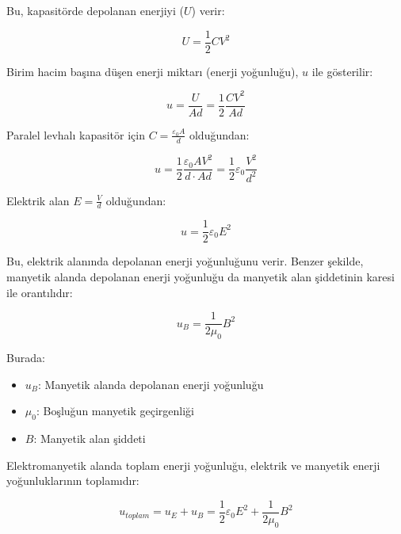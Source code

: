 \documentclass[12pt,a4paper]{fenbil}
\begin{document}
Bu, kapasitörde depolanan enerjiyi ($U$) verir:

\begin{equation}
U = \frac{1}{2} CV^2
\end{equation}

Birim hacim başına düşen enerji miktarı (enerji yoğunluğu), $u$ ile gösterilir:

\begin{equation}
u = \frac{U}{Ad} = \frac{1}{2} \frac{CV^2}{Ad}
\end{equation}

Paralel levhalı kapasitör için $C = \frac{\varepsilon_0 A}{d}$ olduğundan:

\begin{equation}
u = \frac{1}{2} \frac{\varepsilon_0 A V^2}{d \cdot Ad} = \frac{1}{2} \varepsilon_0 \frac{V^2}{d^2}
\end{equation}

Elektrik alan $E = \frac{V}{d}$ olduğundan:

\begin{equation}
u = \frac{1}{2} \varepsilon_0 E^2
\end{equation}

Bu, elektrik alanında depolanan enerji yoğunluğunu verir. Benzer şekilde, manyetik alanda depolanan enerji yoğunluğu da manyetik alan şiddetinin karesi ile orantılıdır:

\begin{equation}
u_B = \frac{1}{2\mu_0} B^2
\end{equation}

Burada:
\begin{itemize}
    \item $u_B$: Manyetik alanda depolanan enerji yoğunluğu
    \item $\mu_0$: Boşluğun manyetik geçirgenliği
    \item $B$: Manyetik alan şiddeti
\end{itemize}

Elektromanyetik alanda toplam enerji yoğunluğu, elektrik ve manyetik enerji yoğunluklarının toplamıdır:

\begin{equation}
u_{toplam} = u_E + u_B = \frac{1}{2} \varepsilon_0 E^2 + \frac{1}{2\mu_0} B^2
\end{equation}
\end{document}
